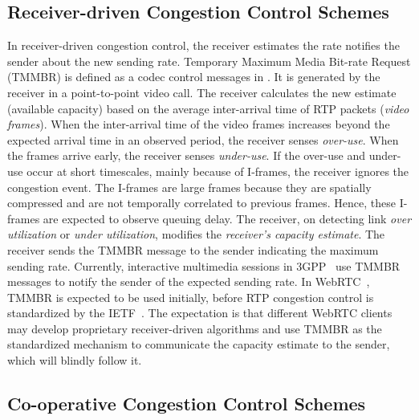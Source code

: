 \subsection{Receiver-driven Congestion Control Schemes}

In receiver-driven congestion control, the receiver estimates the rate
notifies the sender about the new sending rate. Temporary Maximum Media 
Bit-rate Request (TMMBR) is defined as a codec control messages in \cite{rfc5104}.
It is generated by the receiver in a point-to-point video call. The receiver
calculates the new estimate (available capacity) based on the average 
inter-arrival time of RTP packets (\emph{video frames}). When the inter-arrival time
of the video frames increases beyond the expected arrival time in an observed
period, the receiver senses \emph{over-use}. When the frames arrive early, the
receiver senses \emph{under-use}. If the over-use and under-use occur at short
timescales, mainly because of I-frames, the receiver ignores the congestion
event. The I-frames are large frames because they are spatially compressed and
are not temporally correlated to previous frames. Hence, these I-frames are
expected to observe queuing delay. The receiver, on detecting link \emph{over
utilization} or \emph{under utilization}, modifies the \emph{receiver's
capacity estimate}. The receiver sends the TMMBR message to the sender
indicating the maximum sending rate. Currently, interactive multimedia sessions
in 3GPP~\cite{3gpp.26.114} use TMMBR messages to notify the sender of the
expected sending rate. In WebRTC~\cite{jennings:2013:webrtc}, TMMBR is
expected to be used initially, before RTP congestion control is standardized
by the IETF~\cite{rtp-usage}. The expectation is that different WebRTC clients
may develop proprietary receiver-driven algorithms and use TMMBR as the
standardized mechanism to communicate the capacity estimate to the sender,
which will blindly follow it.


\subsection{Co-operative Congestion Control Schemes}
\label{cc:co-op}


